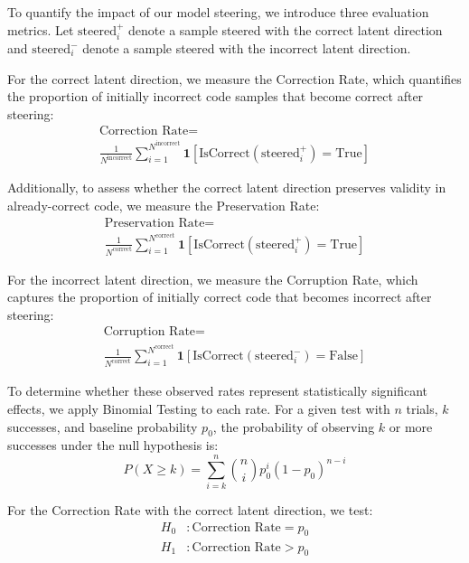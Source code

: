 \documentclass[11pt]{article}
\begin{document}
To quantify the impact of our model steering, we introduce three evaluation metrics. Let $\text{steered}_i^{+}$ denote a sample steered with the correct latent direction and $\text{steered}_i^{-}$ denote a sample steered with the incorrect latent direction.

For the correct latent direction, we measure the Correction Rate, which quantifies the proportion of initially incorrect code samples that become correct after steering:
\begin{multline}
\text{Correction Rate} = \\\frac{1}{N^{\text{incorrect}}} \sum_{i=1}^{N^{\text{incorrect}}} \mathbf{1}[\text{IsCorrect}(\text{steered}_i^{+})= \text{True}]
\end{multline}

Additionally, to assess whether the correct latent direction preserves validity in already-correct code, we measure the Preservation Rate:
\begin{multline}
\text{Preservation Rate} = 
\\\frac{1}{N^{\text{correct}}} \sum_{i=1}^{N^{\text{correct}}} \mathbf{1}[\text{IsCorrect}(\text{steered}_i^{+})= \text{True}]
\end{multline}

For the incorrect latent direction, we measure the Corruption Rate, which captures the proportion of initially correct code that becomes incorrect after steering:
\begin{multline}
\text{Corruption Rate} = 
\\\frac{1}{N^{\text{correct}}} \sum_{i=1}^{N^{\text{correct}}} \mathbf{1}[\text{IsCorrect}(\text{steered}_i^{-})= \text{False}]
\end{multline}

To determine whether these observed rates represent statistically significant effects, we apply Binomial Testing to each rate. For a given test with $n$ trials, $k$ successes, and baseline probability $p_0$, the probability of observing $k$ or more successes under the null hypothesis is:
\begin{equation}
P(X \geq k) = \sum_{i=k}^{n} \binom{n}{i} p_0^i (1-p_0)^{n-i}
\end{equation}

For the Correction Rate with the correct latent direction, we test:
\begin{align}
H_0&: \text{Correction Rate} = p_0 \\
H_1&: \text{Correction Rate} > p_0
\end{align}
\end{document}
